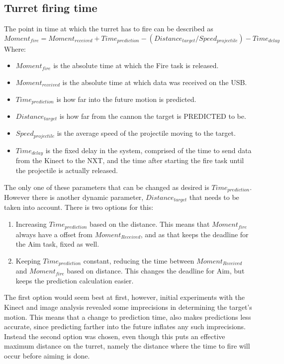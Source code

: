 \subsection{Turret firing time}
The point in time at which the turret has to fire can be described as\\
\begin{math}
Moment_{fire} = Moment_{received} + Time_{prediction} - ( Distance_{target} / Speed_{projectile} )
 - Time_{delay}
\end{math}
Where:
\begin{itemize}
  \item $Moment_{fire}$ is the absolute time at which the Fire task is released.
  \item $Moment_{received}$ is the absolute time at which data was received on the USB.
  \item $Time_{prediction}$ is how far into the future motion is predicted.
  \item $Distance_{target}$ is how far from the cannon the target is PREDICTED to be.
  \item $Speed_{projectile}$ is the average speed of the projectile moving to the target.
  \item $Time_{delay}$ is the fixed delay in the system, comprised of the time to send data from the
  Kinect to the NXT, and the time after starting the fire task until the projectile is actually released.
\end{itemize}
The only one of these parameters that can be changed as desired is $Time_{prediction}$. However
there is another dynamic parameter, $Distance_{target}$ that needs to be taken into account.
There is two options for this:
\begin{enumerate}
  \item Increasing $Time_{prediction}$ based on the distance. This means that $Moment_{fire}$
  always have a offset from $Moment_{Received}$, and as that keeps the deadline for the Aim
  task, fixed as well.
  \item Keeping $Time_{prediction}$ constant, reducing the time between $Moment_{Received}$
  and $Moment_{fire}$ based on distance. This changes the deadline for Aim, but keeps
  the prediction calculation easier.
\end{enumerate}
The first option would seem best at first, however, initial experiments with the Kinect and
image analysis revealed some imprecisions in determining the target's motion. This means
that a change to prediction time, also makes predictions less accurate, since predicting
farther into the future inflates any such imprecisions. Instead the second option was chosen,
even though this puts an effective maximum distance on the turret, namely the distance where
the time to fire will occur before aiming is done.

